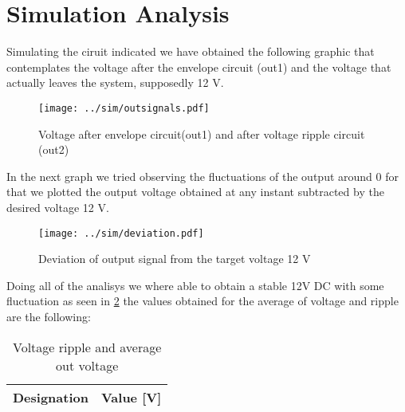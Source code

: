 \section{Simulation Analysis}

Simulating the ciruit indicated we have obtained the following graphic that contemplates the voltage after the envelope circuit (out1) and the voltage that actually leaves the system, supposedly 12 V.

\begin{figure}[H]
  \centering
  \small
  \texttt{[image: ../sim/outsignals.pdf]}
  \caption{Voltage after envelope circuit(out1) and after voltage ripple circuit (out2)}
  \label{fig:out1_out2}
\end{figure}


In the next graph we tried observing the fluctuations of the output around 0 for that we plotted the output voltage obtained at any instant subtracted by the desired voltage 12 V.

\begin{figure}[H]
  \centering
  \texttt{[image: ../sim/deviation.pdf]}
  \vspace{-5mm}
  \caption{Deviation of output signal from the target voltage 12 V }
  \label{fig:deviation}
\end{figure}

Doing all of the analisys we where able to obtain a stable 12V DC  with some fluctuation as seen in \ref{fig:deviation} the values obtained for the average of voltage and ripple are the following:

\begin{table}[H]
  \centering
  \begin{tabular}{|c|c|}
    \hline
        {\bf Designation} & {\bf Value [V]} \\ \hline
        
  \end{tabular}
  \caption{Voltage ripple and average out voltage} 
  \label{tab:rip}
\end{table}




